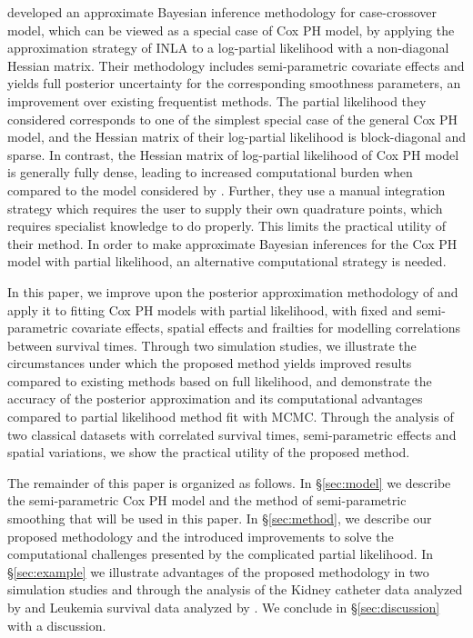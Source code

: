 \documentclass[ba]{imsart}
\begin{document}
\cite{casecross} developed an approximate Bayesian inference methodology for case-crossover model, which can be viewed as a special case of Cox PH model, by applying the approximation strategy of INLA to a log-partial likelihood with a non-diagonal Hessian matrix. 
Their methodology includes semi-parametric covariate effects and yields full posterior uncertainty for the corresponding smoothness parameters, an improvement over existing frequentist methods. The partial likelihood they considered corresponds to one of the simplest special case of the general Cox PH model, and the Hessian matrix of their log-partial likelihood is block-diagonal and sparse. In contrast, the Hessian matrix of log-partial likelihood of Cox PH model is generally fully dense, leading to increased computational burden when compared to the model considered by \cite{casecross}. Further, they use a manual integration strategy which requires the user to supply their own quadrature points, which requires specialist knowledge to do properly. This limits the practical utility of their method. In order to make approximate Bayesian inferences for the Cox PH model with partial likelihood, an alternative computational strategy is needed.



In this paper, we improve upon the posterior approximation methodology of \cite{casecross} and apply it to fitting Cox PH models with partial likelihood, with fixed and semi-parametric covariate effects, spatial effects and frailties for modelling correlations between survival times. Through two simulation studies, we illustrate the circumstances under which the proposed method yields improved results compared to existing methods based on full likelihood, and demonstrate the accuracy of the posterior approximation and its computational advantages compared to partial likelihood method fit with MCMC. Through the analysis of two classical datasets with correlated survival times, semi-parametric effects and spatial variations, we show the practical utility of the proposed method.


The remainder of this paper is organized as follows. In \S\ref{sec:model} we describe the semi-parametric Cox PH model and the method of semi-parametric smoothing that will be used in this paper. In \S\ref{sec:method}, we describe our proposed methodology and the introduced improvements to solve the computational challenges presented by the complicated partial likelihood. In \S\ref{sec:example} we illustrate advantages of the proposed methodology in two simulation studies and through the analysis of the Kidney catheter data analyzed by \cite{kidney} and Leukemia survival data analyzed by \cite{inlacoxph}. We conclude in \S\ref{sec:discussion} with a discussion.
\end{document}
